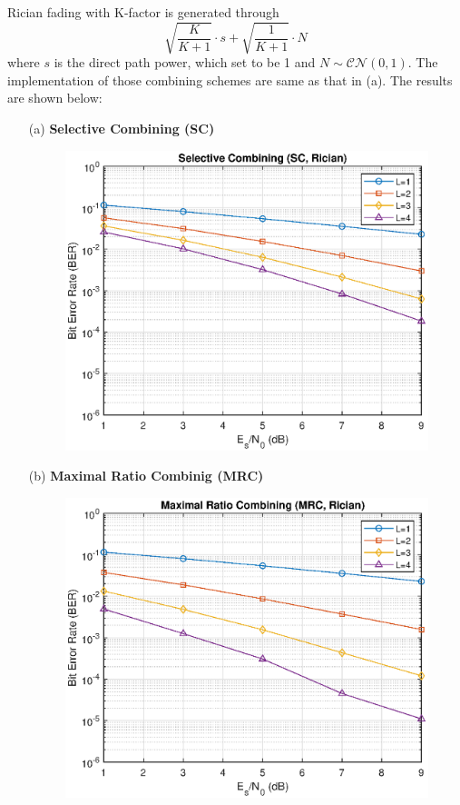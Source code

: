 Rician fading with K-factor is generated through
\begin{equation*}
    \sqrt{\frac{K}{K + 1}}  \cdot s + \sqrt{\frac{1}{K + 1}} \cdot N
\end{equation*}
where $s$ is the direct path power, which set to be 1 and $N \sim \mathcal{CN}(0, 1)$. The implementation
of those combining schemes are same as that in (a). The results are shown below:
\vfill
\begin{itemize}
    \item[(a)] \textbf{Selective Combining (SC)} \hfill \\
    \begin{figure}[H]
        \centering
        \includegraphics[scale = 0.85]{SC_rician.eps}
    \end{figure}
    \item[(b)] \textbf{Maximal Ratio Combinig (MRC)} \hfill \\
    \begin{figure}[H]
        \centering
        \includegraphics[scale = 0.85]{MRC_rician.eps}

\end{figure}
\end{itemize}
